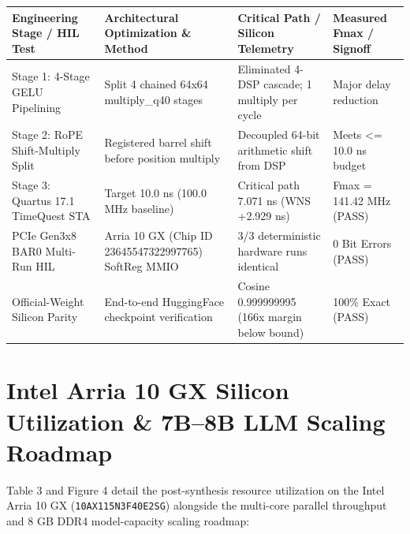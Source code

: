 \documentclass[11pt,a4paper]{article}
\begin{document}
{\footnotesize\renewcommand{\arraystretch}{1.14}\begin{longtable}{@{}L{0.23\textwidth}L{0.27\textwidth}L{0.24\textwidth}L{0.16\textwidth}@{}}\toprule

\textbf{Engineering Stage /\allowbreak{} HIL Test} & \textbf{Architectural Optimization \& Method} & \textbf{Critical Path /\allowbreak{} Silicon Telemetry} & \textbf{Measured Fmax /\allowbreak{} Signoff}\\\midrule\endhead

Stage 1: 4-Stage GELU Pipelining & Split 4 chained 64x64 multiply\_\allowbreak{}q40 stages & Eliminated 4-DSP cascade; 1 multiply per cycle & Major delay reduction\\[2pt]

Stage 2: RoPE Shift-Multiply Split & Registered barrel shift before position multiply & Decoupled 64-bit arithmetic shift from DSP & Meets <=\allowbreak{} 10.0 ns budget\\[2pt]

Stage 3: Quartus 17.1 TimeQuest STA & Target 10.0 ns (\allowbreak{}100.0 MHz baseline)\allowbreak{} & Critical path 7.071 ns (\allowbreak{}WNS +\allowbreak{}2.929 ns)\allowbreak{} & Fmax =\allowbreak{} 141.42 MHz (\allowbreak{}PASS)\allowbreak{}\\[2pt]

PCIe Gen3x8 BAR0 Multi-Run HIL & Arria 10 GX (\allowbreak{}Chip ID 23645547\allowbreak{}32299776\allowbreak{}5)\allowbreak{} SoftReg MMIO & 3/\allowbreak{}3 deterministic hardware runs identical & 0 Bit Errors (\allowbreak{}PASS)\allowbreak{}\\[2pt]

Official-Weight Silicon Parity & End-to-end HuggingFace checkpoint verification & Cosine 0.99999999\allowbreak{}5 (\allowbreak{}166x margin below bound)\allowbreak{} & 100\% Exact (\allowbreak{}PASS)\allowbreak{}\\[2pt]

\bottomrule\end{longtable}}

\section{Intel Arria 10 GX Silicon Utilization \& 7B--8B LLM Scaling Roadmap}

Table 3 and Figure 4 detail the post-synthesis resource utilization on the Intel Arria 10 GX (\texttt{10AX115N3F40E2SG}) alongside the multi-core parallel throughput and 8 GB DDR4 model-capacity scaling roadmap:
\end{document}
